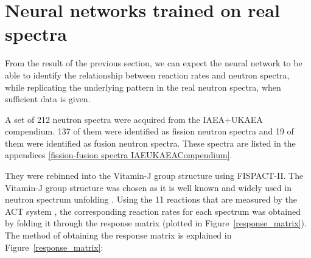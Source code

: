 \documentclass[a4paper, 12pt]{article}
\begin{document}
\section{Neural networks trained on real spectra}\label{RealResults}
From the result of the previous section, we can expect the neural network to be able to identify the relationship between reaction rates and neutron spectra, while replicating the underlying pattern in the real neutron spectra, when sufficient data is given.

A set of 212 neutron spectra were acquired from the IAEA+UKAEA compendium\cite{IAEAUKAEACompendium}. 137 of them were identified as fission neutron spectra and 19 of them were identified as fusion neutron spectra. These spectra are listed in the appendices \ref{fission-fusion spectra IAEUKAEACompendium}.

They were rebinned into the Vitamin-J group structure using FISPACT-II\cite{Fispact}. The Vitamin-J group structure was chosen as it is well known and widely used in neutron spectrum unfolding \cite{SpectrumUnfoldingMethodology} \cite{ADRIANA_lab_equiv} \cite{Stayslpnnl}. Using the 11 reactions that are measured by the ACT system \cite{LWP_LTIS}, the corresponding reaction rates for each spectrum was obtained by folding it through the response matrix (plotted in Figure~\ref{response_matrix}). The method of obtaining the response matrix is explained in Figure~\ref{response_matrix}:
\end{document}

